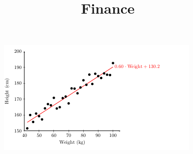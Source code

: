 \documentclass[twocolumn,landscape,8pt]{article}
\begin{document}
\title{Finance}

\makeatletter
\newcommand\CTFont[1][small]{
\renewenvironment{table}
               {\@float{table}\csname#1\endcsname}
               {\end@float}
\renewenvironment{table*}
               {\@dblfloat{table}\csname#1\endcsname}
               {\end@dblfloat}
}
\makeatother







\begin{figure}[t]
  \centering\includegraphics[width=\columnwidth,height=0.1\textheight]{linear}
\end{figure}

\end{document}
